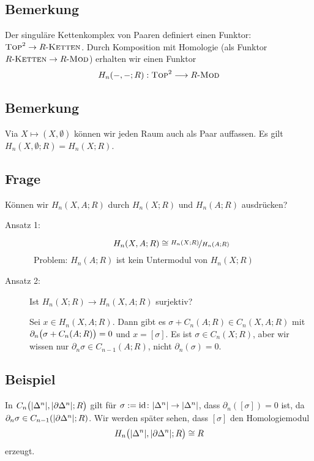 \subsection[Definition: Der singuläre Kettenkomplex von Paaren definiert einen Funktor]{Bemerkung} %
\label{sub:83}
Der singuläre Kettenkomplex von Paaren definiert einen Funktor: $\TOP^2 \to R\text{-}\textsc{Ketten}$. Durch Komposition mit Homologie (als Funktor 
$R\text{-}\textsc{Ketten} \to R\text{-}\MOD$) erhalten wir einen Funktor
\[
	H_n(-,-;R) : \TOP^2 \longrightarrow R\text{-}\MOD
\]

\subsection[Bemerkung: Topologische Räume als Paar auffassen]{Bemerkung} %
\label{sub:84}
Via $X \mapsto (X,\emptyset)$ können wir jeden Raum auch als Paar auffassen. Es gilt $H_n(X,\emptyset;R) = H_n(X;R)$.

\subsection[Frage: Können wir $H_n(X,A;R)$ durch $H_n(X;R)$ und $H_n(A;R)$ ausdrücken?]{Frage} %
\label{sub:85}
Können wir $H_n(X,A;R)$ durch $H_n(X;R)$ und $H_n(A;R)$ ausdrücken? 
\begin{description}
	\item[Ansatz 1:] 
	\[
		H_n(X,A;R) \cong \nicefrac{H_n(X;R)}{H_n(A;R)}
	\]
	\ifxetexorluatex \faWarningSign \fi \, Problem: $H_n(A;R)$ ist kein Untermodul von $H_n(X;R)$
	\item[Ansatz 2:] Ist $H_n(X;R) \to H_n(X,A;R)$ surjektiv?
	
	Sei $x \in H_n(X,A;R)$. Dann gibt es $\sigma + C_n(A;R) \in C_n(X,A;R)$ mit $\partial_n \enbrace[\big]{\sigma + C_n(A;R)} = 0$ und $x= [\sigma]$. Es ist 
	$\sigma \in C_n(X;R)$, aber wir wissen nur $\partial_n \sigma \in C_{n-1}(A;R)$, nicht $\partial_n(\sigma)= 0$. \hfill \ifxetexorluatex {\large \faMeh} \fi
\end{description}

\subsection[Beispiel: Homologie des Paares $(\abs*{\Delta^n}, \abs*{\partial \Delta^n})$]{Beispiel} %
\label{sub:86}
In $C_n \enbrace[\big]{\abs*{\Delta^n}, \abs*{\partial \Delta^n};R}$ gilt für $\sigma := \id \colon \abs*{\Delta^n} \to \abs*{\Delta^n}$, dass $\partial_n([\sigma])=0$ ist, da 
$\partial_n \sigma \in C_{n-1} \enbrace*{\abs*{\partial \Delta^n};R}$. Wir werden später sehen, dass $[\sigma]$ den Homologiemodul
\[
	H_n \enbrace[\big]{\abs*{\Delta^n}, \abs*{\partial \Delta^n};R  } \cong R 
\]
erzeugt.

